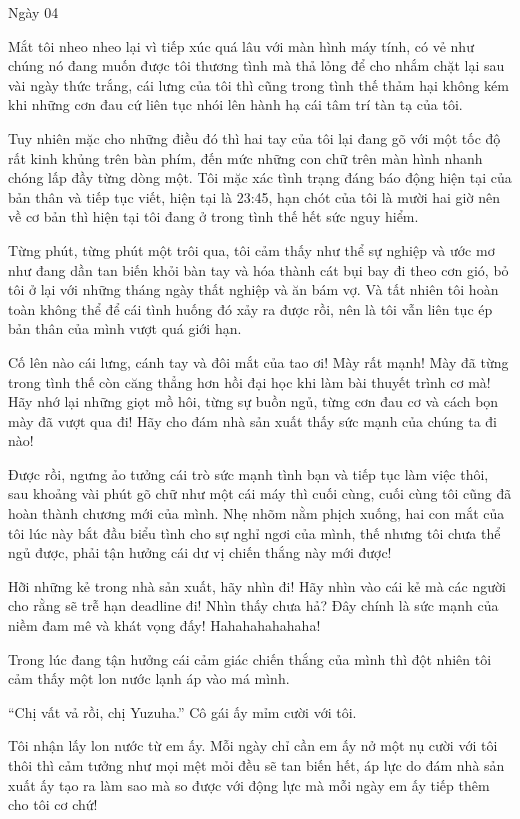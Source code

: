 {Ngày 04}
{

Mắt tôi nheo nheo lại vì tiếp xúc quá lâu với màn hình máy tính, có vẻ
như chúng nó đang muốn được tôi thương tình mà thả lỏng để cho nhắm chặt
lại sau vài ngày thức trắng, cái lưng của tôi thì cũng trong tình thế
thảm hại không kém khi những cơn đau cứ liên tục nhói lên hành hạ cái
tâm trí tàn tạ của tôi.

Tuy nhiên mặc cho những điều đó thì hai tay của tôi lại đang gõ với một
tốc độ rất kinh khủng trên bàn phím, đến mức những con chữ trên màn hình
nhanh chóng lấp đầy từng dòng một. Tôi mặc xác tình trạng đáng báo động
hiện tại của bản thân và tiếp tục viết, hiện tại là 23:45, hạn chót của
tôi là mười hai giờ nên về cơ bản thì hiện tại tôi đang ở trong tình thế
hết sức nguy hiểm.

Từng phút, từng phút một trôi qua, tôi cảm thấy như thể sự nghiệp và ước
mơ như đang dần tan biến khỏi bàn tay và hóa thành cát bụi bay đi theo
cơn gió, bỏ tôi ở lại với những tháng ngày thất nghiệp và ăn bám vợ. Và
tất nhiên tôi hoàn toàn không thể để cái tình huống đó xảy ra được rồi,
nên là tôi vẫn liên tục ép bản thân của mình vượt quá giới hạn.

Cố lên nào cái lưng, cánh tay và đôi mắt của tao ơi! Mày rất mạnh! Mày
đã từng trong tình thế còn căng thẳng hơn hồi đại học khi làm bài thuyết
trình cơ mà! Hãy nhớ lại những giọt mồ hôi, từng sự buồn ngủ, từng cơn
đau cơ và cách bọn mày đã vượt qua đi! Hãy cho đám nhà sản xuất thấy sức
mạnh của chúng ta đi nào!

Được rồi, ngưng ảo tưởng cái trò sức mạnh tình bạn và tiếp tục làm việc
thôi, sau khoảng vài phút gõ chữ như một cái máy thì cuối cùng, cuối
cùng tôi cũng đã hoàn thành chương mới của mình. Nhẹ nhõm nằm phịch
xuống, hai con mắt của tôi lúc này bắt đầu biểu tình cho sự nghỉ ngơi
của mình, thế nhưng tôi chưa thể ngủ được, phải tận hưởng cái dư vị
chiến thắng này mới được!

Hỡi những kẻ trong nhà sản xuất, hãy nhìn đi! Hãy nhìn vào cái kẻ mà các
người cho rằng sẽ trễ hạn deadline đi! Nhìn thấy chưa hả? Đây chính là
sức mạnh của niềm đam mê và khát vọng đấy! Hahahahahahaha!

Trong lúc đang tận hưởng cái cảm giác chiến thắng của mình thì đột nhiên
tôi cảm thấy một lon nước lạnh áp vào má mình.

``Chị vất vả rồi, chị Yuzuha.'' Cô gái ấy mỉm cười với tôi.

Tôi nhận lấy lon nước từ em ấy. Mỗi ngày chỉ cần em ấy nở một nụ cười
với tôi thôi thì cảm tưởng như mọi mệt mỏi đều sẽ tan biến hết, áp lực
do đám nhà sản xuất ấy tạo ra làm sao mà so được với động lực mà mỗi
ngày em ấy tiếp thêm cho tôi cơ chứ!

}
